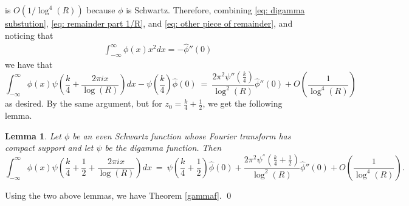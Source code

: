 \documentclass[11pt, reqno]{amsart}
\makeatletter
\renewenvironment{proof}[1][\proofname]{\par
  \vspace{-.7\topsep}%
  \pushQED{\qed}%
  \normalfont
  \topsep0pt \partopsep0pt %
  \trivlist
  \item[\hskip\labelsep
        \itshape
    #1\@addpunct{.}]\ignorespaces
}{%
  \popQED\endtrivlist\@endpefalse
  \addvspace{6pt plus 6pt} %
}
\newtheorem{lemma}[theorem]{Lemma}
\theoremstyle{definition}
\theoremstyle{remark}
\numberwithin{equation}{section}
\renewcommand{\hat}{\widehat}
\makeatother
\begin{document}
\begin{proof}
\begin{equation}
\end{equation} is  $O\left({1}/{\log^4(R)}\right)$ because $\phi$ is Schwartz.
Therefore, combining \eqref{eq: digamma substution},  \eqref{eq: remainder part 1/R}, and \eqref{eq: other piece of remainder}, and noticing that \begin{align}
    \int_{-\infty}^{\infty} \phi(x)x^2dx = -\hat\phi''(0)
\end{align} we have that
\begin{equation}
\int_{-\infty}^\infty \phi(x)\psi\left(\frac{k}{4}+ \frac{2\pi i x}{\log(R)}\right) dx - \psi\left(\frac{k}{4}\right)\hat\phi(0) \  =  \ \frac{2\pi^2\psi''\left(\frac{k}{4}\right)}{\log^2(R)}\hat\phi''(0) + O\left(\frac{1}{\log^4(R)}\right)    
\end{equation} as desired.
\end{proof}
By the same argument, but for $z_0 = \frac{k}{4}+ \frac{1}{2}$, we get the following lemma. 
\begin{lemma} Let $\phi$ be an even Schwartz function whose Fourier transform has compact support and let $\psi$ be the digamma function. Then
      \begin{equation}
        \int_{-\infty}^\infty \phi(x)\psi\left(\frac{k}{4}+ \frac{1}{2}+ \frac{2\pi i x}{\log(R)}\right) dx \ =\ \psi\left(\frac{k}{4} + \frac{1}{2}\right)\hat\phi(0) +\frac{2\pi^2\psi^{''}(\frac{k}{4} + \frac{1}{2})}{\log^2(R)}\hat\phi''(0) + O\left(\frac{1}{\log^4(R)}\right). 
        \end{equation}
    \end{lemma}
Using the two above lemmas, we have Theorem \ref{gammaf}. \qed

\vspace{1em} 


\vspace{1em}
\end{document}

